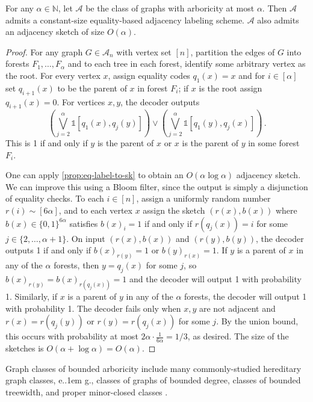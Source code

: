 \documentclass{article}
\makeatletter
\newcommand{\ind}[1]{\mathds{1} \left[ #1 \right] }
\newcommand{\zo}{\{0,1\}}
\newcommand{\cA}{\ensuremath{\mathcal{A}}}
\newcommand{\bN}{\ensuremath{\mathbb{N}}}
\newcommand*\eg{e.\kern.1em g.\@\xspace} %
\makeatother
\begin{document}
\begin{lemma}
\label{lemma:arboricity}
For any $\alpha \in \bN$, let $\cA$ be the class of graphs with arboricity at most $\alpha$. Then
$\cA$ admits a constant-size equality-based adjacency labeling scheme. $\cA$ also admits an
adjacency sketch of size $O(\alpha)$.
\end{lemma}
\begin{proof}
For any graph $G \in \cA_n$ with vertex set $[n]$, partition the edges of $G$ into forests $F_1,
\dotsc, F_\alpha$ and to each tree in each forest, identify some arbitrary vertex as the root. For
every vertex $x$, assign equality codes $q_1(x) = x$ and for $i \in [\alpha]$ set $q_{i+1}(x)$ to be
the parent of $x$ in forest $F_i$; if $x$ is the root assign $q_{i+1}(x) = 0$.  For vertices $x,y$,
the decoder outputs
\[
  \left(\bigvee_{j = 2}^\alpha \ind{ q_1(x), q_j(y) } \right) \vee
  \left(\bigvee_{j = 2}^\alpha \ind{ q_1(y), q_j(x) } \right) \,.
\]
This is 1 if and only if $y$ is the parent of $x$ or $x$ is the parent of $y$ in some forest $F_i$.

One can apply \cref{prop:eq-label-to-sk} to obtain an $O(\alpha \log \alpha)$ adjacency sketch. We can
improve this using a Bloom filter, since the output is simply a disjunction of equality checks. To
each $i \in [n]$, assign a uniformly random number $r(i) \sim [6\alpha]$, and to each vertex $x$
assign the sketch $(r(x), b(x))$ where $b(x) \in \zo^{6\alpha}$ satisfies $b(x)_i = 1$ if and
only if $r(q_j(x)) = i$ for some $j \in \{2, \dotsc, \alpha+1\}$. On input $(r(x), b(x))$ and
$(r(y), b(y))$, the decoder outputs 1 if and only if $b(x)_{r(y)} = 1$ or $b(y)_{r(x)} = 1$. If $y$
is a parent of $x$ in any of the $\alpha$ forests, then $y=q_j(x)$ for some $j$, so $b(x)_{r(y)} =
b(x)_{r(q_j(x))} = 1$ and the decoder will output 1 with probability 1. Similarly, if $x$ is a
parent of $y$ in any of the $\alpha$ forests, the decoder will output 1 with probability 1. The
decoder fails only when $x,y$ are not adjacent and $r(x) = r(q_j(y))$ or $r(y) = r(q_j(x))$ for some
$j$. By the union bound, this occurs with probability at most $2\alpha \cdot \frac{1}{6\alpha} =
1/3$, as desired. The size of the sketches is $O(\alpha + \log \alpha) = O(\alpha)$.
\end{proof}

\begin{remark}
\label{remark:treewidth}
Graph classes of bounded arboricity include many commonly-studied hereditary graph classes, \eg, classes of graphs of bounded degree, classes of bounded treewidth, and proper minor-closed classes \cite{Mad67}.
\end{remark}
\end{document}
